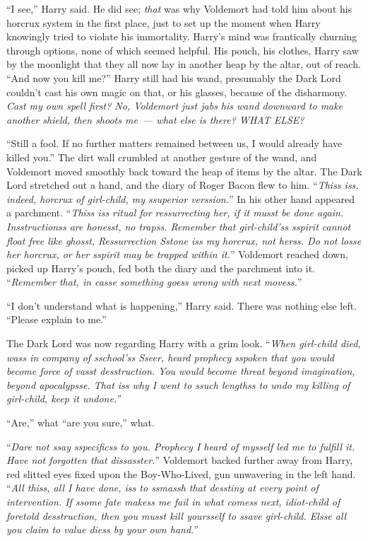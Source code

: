 ``I see,'' Harry said. He did see; \emph{that} was why Voldemort had told him about his horcrux system in the first place, just to set up the moment when Harry knowingly tried to violate his immortality. Harry's mind was frantically churning through options, none of which seemed helpful. His pouch, his clothes, Harry saw by the moonlight that they all now lay in another heap by the altar, out of reach. ``And now you kill me?'' Harry still had his wand, presumably the Dark Lord couldn't cast his own magic on that, or his glasses, because of the disharmony. \emph{Cast my own spell first? No, Voldemort just jabs his wand downward to make another shield, then shoots me~--- what else is there? WHAT ELSE?}

``Still a fool. If no further matters remained between us, I would already have killed you.'' The dirt wall crumbled at another gesture of the wand, and Voldemort moved smoothly back toward the heap of items by the altar. The Dark Lord stretched out a hand, and the diary of Roger Bacon flew to him. ``\emph{Thiss iss, indeed, horcrux of girl-child, my ssuperior verssion.}'' In his other hand appeared a parchment. ``\emph{Thiss iss ritual for ressurrecting her, if it musst be done again. Insstructionss are honesst, no trapss. Remember that girl-child'ss sspirit cannot float free like ghosst, Ressurrection Sstone iss my horcrux, not herss. Do not losse her horcrux, or her sspirit may be trapped within it.}'' Voldemort reached down, picked up Harry's pouch, fed both the diary and the parchment into it. ``\emph{Remember that, in casse something goess wrong with next movess.}''

``I don't understand what is happening,'' Harry said. There was nothing else left. ``Please explain to me.''

The Dark Lord was now regarding Harry with a grim look. ``\emph{When girl-child died, wass in company of sschool'ss Sseer, heard prophecy sspoken that you would become force of vasst desstruction. You would become threat beyond imagination, beyond apocalypsse. That iss why I went to ssuch lengthss to undo my killing of girl-child, keep it undone.''}

``Are,'' what ``are you sure,'' what.

``\emph{Dare not ssay sspecificss to you. Prophecy I heard of mysself led me to fulfill it. Have not forgotten that dissasster.}'' Voldemort backed further away from Harry, red slitted eyes fixed upon the Boy-Who-Lived, gun unwavering in the left hand. ``\emph{All thiss, all I have done, iss to ssmassh that desstiny at every point of intervention. If ssome fate makess me fail in what comess next, idiot-child of foretold desstruction, then you musst kill yoursself to ssave girl-child. Elsse all you claim to value diess by your own hand.}''

